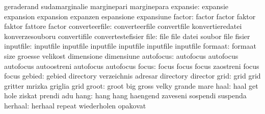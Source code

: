                            geraderand                sudamarginalie
                           marginepari               marginepara
                 expansie: expansie                  expansion
                           expansion                 expanzen
                           espansione                expansiune
                   factor: factor                    factor
                           faktor                    faktor
                           fattore                   factor
           converteerfile: converteerfile            convertfile
                           konvertieredatei          konverzesouboru
                           convertifile              convertestefisier
                     file: file                      file
                           datei                     soubor
                           file                      fisier
                inputfile: inputfile                 inputfile
                           inputfile                 inputfile
                           inputfile                 inputfile %
                  formaat: formaat                   size
                           groesse                   velikost
                           dimensione                dimensiune
                autofocus: autofocus                 autofocus
                           autofocus                 autoostreni
                           autofocus                 autofocus
                    focus: focus                     focus
                           focus                     zaostreni
                           focus                     focus %
                   gebied: gebied                    directory
                           verzeichnis               adresar
                           directory                 director
                     grid: grid                      grid
                           gritter                   mrizka
                           griglia                   grid
                    groot: groot                     big
                           gross                     velky
                           grande                    mare
                     haal: haal                      get
                           hole                      ziskat
                           prendi                    adu
                     hang: hang                      hang
                           haengend                  zaveseni
                           sospendi                  suspenda
                  herhaal: herhaal                   repeat
                           wiederholen               opakovat
